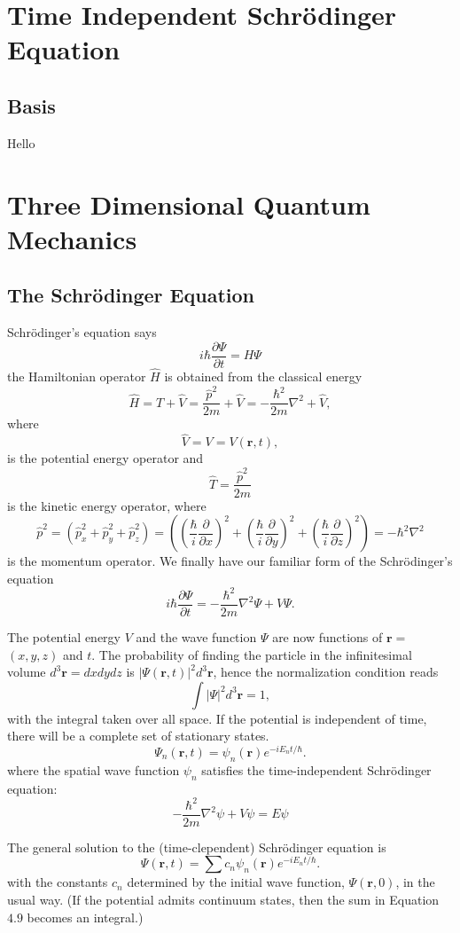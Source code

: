 \documentclass[main.tex]{subfiles}
\begin{document}
\maketitle
\chapter{Time Independent Schr\"{o}dinger Equation}
\section{Basis}
Hello

\chapter{Three Dimensional Quantum Mechanics}
\section{The Schr\"{o}dinger Equation}
Schrödinger's equation says
$$
i \hbar \frac{\partial \Psi}{\partial t}=H \Psi
$$
the Hamiltonian operator $\hat{H}$ is obtained from the classical energy
$$
\hat{H}=\hat{T}+\hat{V} = \frac{\hat{p}^2}{2 m}+\hat{V}=-\frac{\hbar^2}{2 m} \nabla^2+\hat{V},
$$
where $$\hat{V}=V=V(\mathbf{r}, t),$$ is the potential energy operator and
$$\hat{T}=\frac{\hat{p}^2}{2 m}
$$ is the kinetic energy operator, where 
$$ \hat{p}^2 = \left(\hat{p}_x^2+\hat{p}_y^2+\hat{p}_z^2\right)=\left(\left(\frac{\hbar}{i} \frac{\partial}{\partial x}\right)^2+\left(\frac{\hbar}{i} \frac{\partial}{\partial y}\right)^2+\left(\frac{\hbar}{i} \frac{\partial}{\partial z}\right)^2\right)  = - \hbar^2 \nabla^2$$
is the momentum operator. We finally have our familiar form of the Schrödinger's equation 
$$i \hbar \frac{\partial \Psi}{\partial t}=-\frac{\hbar^2}{2 m} \nabla^2 \Psi+V \Psi.$$

The potential energy $V$ and the wave function $\Psi$ are now functions of $\mathbf{r}=$ $(x, y, z)$ and $t$. The probability of finding the particle in the infinitesimal volume $d^3 \mathbf{r}=d x d y d z$ is $|\Psi(\mathbf{r}, t)|^2 d^3 \mathbf{r}$, hence the normalization condition reads
$$
\int|\Psi|^2 d^3 \mathbf{r}=1,
$$
with the integral taken over all space. If the potential is independent of time, there will be a complete set of stationary states.
$$
\Psi_n(\mathbf{r}, t)=\psi_n(\mathbf{r}) e^{-i E_n t / \hbar} .
$$
where the spatial wave function $\psi_n$ satisfies the time-independent Schrödinger equation:
$$
-\frac{\hbar^2}{2 m} \nabla^2 \psi+V \psi=E \psi
$$

The general solution to the (time-clependent) Schrödinger equation is
$$
\Psi(\mathbf{r}, t)=\sum c_n \psi_n(\mathbf{r}) e^{-i E_n t / \hbar} .
$$
with the constants $c_n$ determined by the initial wave function, $\Psi(\mathbf{r}, 0)$, in the usual way. (If the potential admits continuum states, then the sum in Equation $4.9$ becomes an integral.)


\end{document}
